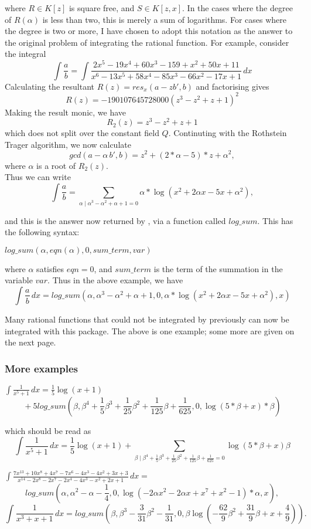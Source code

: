 where $R \in K[z]$ is square free, and $S \in K[z,x]$. In the cases where the degree of $R(\alpha)$ is less than two, this is merely a sum of logarithms. For cases where the degree is two or more, I have chosen to adopt this notation as the answer to the original problem of integrating the rational function. For example,
consider the integral
 \[ \int \frac{a}{b}=\int \frac{2x^5-19x^4+60x^3-159+x^2+50x+11}{x^6-13x^5+58x^4-85x^3-66x^2-17x+1}\, dx \]
Calculating the resultant $R(z)=res_x(a-zb',b)$ and factorising gives
  \[ R(z)=-190107645728000(z^3-z^2+z+1)^{2} \]
Making the result monic, we have
\[ R_2(z)=z^3-z^2+z+1 \]
which does not split over the constant field $Q$.
Continuting with the Rothstein Trager algorithm, we now calculate
\[ gcd(a-\alpha\,b',b)=z^2+(2*\alpha-5)*z+\alpha^2, \] where $\alpha$ is a root of $R_2(z)$. \\
Thus we can write
\[ \int \frac{a}{b}= \sum_{\alpha \mid \alpha^3-\alpha^2+\alpha+1=0} \alpha*\log(x^2+2\alpha x-5x+\alpha^2), \]

and this is the answer now returned by \REDUCE, via a function called $log\_sum$. This has the following syntax:
\begin{center}$ log\_sum(\alpha,eqn(\alpha),0,sum\_term,var)$ \end{center}
where $\alpha$ satisfies $eqn=0$, and $sum\_term$ is the term of the summation in the variable $var$. Thus in the above example, we have
\[ \int \frac{a}{b}\,dx= log\_sum(\alpha,\alpha^3-\alpha^2+\alpha+1,0,\alpha*\log(x^2+2\alpha x-5x+\alpha^2),x) \]

Many rational functions that could not be integrated by \REDUCE previously can now be integrated with this package. The above is one example; some more are given on the next page.

\subsubsection{More examples}
\(
\displaystyle \int \frac{1}{x^5+1} \, dx = \frac{1}{5}\log(x + 1)
\)
\[
\mbox{} + 5 log\_sum(\beta,\beta^4+\frac{1}{5}\beta^3+\frac{1}{25}\beta^2+\frac{1}{125}\beta+\frac{1}{625},0,\log(5*\beta+x)*\beta)
\]

which should be read as
\[
\int \frac{1}{x^5+1}\,dx = \frac{1}{5}\log(x+1)+\sum_{\beta \mid\beta^4+\frac{1}{5}\beta^3+\frac{1}{25}\beta^2+\frac{1}{125}\beta+\frac{1}{625}=0}\log(5*\beta+x)\beta
\]

\(
\displaystyle
\int \frac{7x^{13}+10x^8+4x^7-7x^6-4x^3-4x^2+3x+3}{x^{14}-2x^8-2x^7-2x^4-4x^3-x^2+2x+1} \, dx  =
\)
\[
log\_sum(\alpha,\alpha^2  -\alpha -\frac{1}{4},0,\log( - 2\alpha x^2  - 2\alpha x + x^7  + x^2  - 1)*\alpha,x) ,
\]
\[ \int \frac{1}{x^3+x+1} \, dx = log\_sum(\beta,\beta^3-\frac{3}{31}\beta^2-\frac{1}{31},0,\beta \log(-\frac{62}{9}\beta^2+\frac{31}{9} \beta +x+\frac{4}{9})). \]

